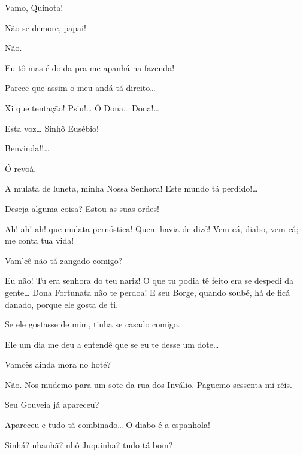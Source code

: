  Vamo, Quinota!

 Não se demore, papai!

 Não.

  Eu tô mas é doida pra me apanhá na fazenda! 


  Parece que assim o meu andá tá direito\ldots{}

  Xi que tentação!  Psiu!\ldots{} Ó
Dona\ldots{} Dona!\ldots{}

  Esta voz\ldots{}  Sinhô Eusébio!

 Benvinda!!\ldots{}

  Ó revoá.

 A mulata de luneta, minha Nossa Senhora! Este mundo tá
perdido!\ldots{}

  Deseja alguma coisa? Estou
as suas ordes!

 Ah! ah! ah! que mulata pernóstica! Quem havia de dizê! Vem cá,
diabo, vem cá; me conta tua vida!

  Vam’cê não tá zangado comigo?

 Eu não! Tu era senhora do teu nariz! O que tu podia tê feito era
se despedi da gente\ldots{} Dona Fortunata não te perdoa! E seu Borge, quando
soubé, há de ficá danado, porque ele gosta de ti.

 Se ele gostasse de mim, tinha se casado comigo.

 Ele um dia me deu a entendê que se eu te desse um dote\ldots{}

 Vamcês ainda mora no hoté?

 Não. Nos mudemo para um sote da rua dos Inválio. Paguemo sessenta
mi-réis.

 Seu Gouveia já apareceu?

 Apareceu e tudo tá combinado\ldots{}  O diabo é a espanhola!

 Sinhá? nhanhã? nhô Juquinha? tudo tá bom?

